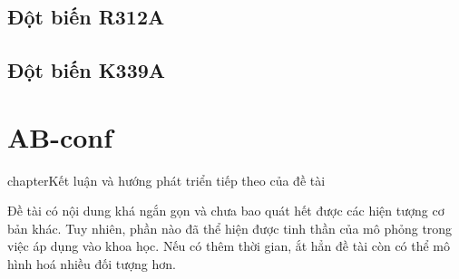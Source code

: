 \documentclass[12pt,a4paper,reqno, oneside]{book}
\begin{document}
	\subsection{Đột biến R312A}
\hspace{18pt}
	\subsection{Đột biến K339A}
\hspace{18pt}
\section{AB-conf}
\hspace{18pt}


\newpage
\pagestyle{fancy}
\setcounter{chapter}{3}
chapter{Kết luận và hướng phát triển tiếp theo của đề tài}
\hspace{18pt}
	
	
	Đề tài có nội dung khá ngắn gọn và chưa bao quát hết được các hiện tượng cơ bản khác. Tuy nhiên, phần nào đã thể hiện được tinh thần của mô phỏng trong việc áp dụng vào khoa học. Nếu có thêm thời gian, ắt hẳn đề tài còn có thể mô hình hoá nhiều đối tượng hơn.\\ 
	


\printbibliography
{}
\clearpage





\appendix
{}
\clearpage
\newpage

\end{document}

